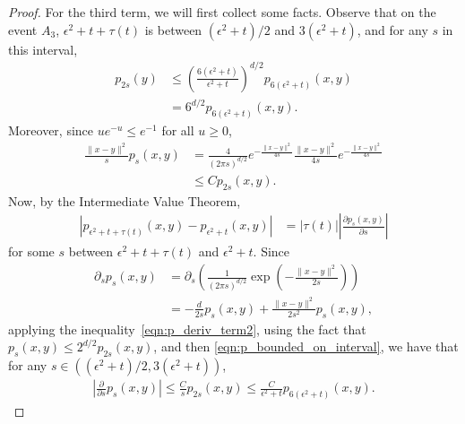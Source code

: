 \documentclass[EJP]{ejpecp} %
\begin{document}
\begin{proof}
    For the third term, we will first collect some facts.
    Observe that on the event $A_3$,
    $\epsilon^2 + t + \tau(t)$ is between
    $(\epsilon^2 + t)/ 2$ and $3(\epsilon^2 + t)$,
    and for any $s$ in this interval,
    \begin{align}
        p_{2s}(y)
        &\le \nonumber
        \left( \frac{
            6 (\epsilon^2 + t)
        }{
            \epsilon^2 + t
        } \right)^{d/2}
        p_{6(\epsilon^2 + t)}(x, y)
        \\ &= \label{eqn:p_bounded_on_interval}
        6^{d/2}
        p_{6(\epsilon^2 + t)}(x, y) .
    \end{align}
    Moreover, since $u e^{-u} \le e^{-1}$ for all $u \ge 0$,
    \begin{align}
        \frac{\|x - y\|^2}{s} p_s(x, y)
        &= \nonumber
        \frac{4}{(2 \pi s)^{d/2}}
        e^{- \frac{ \|x-y\|^2 }{ 4s }}
        \frac{\|x-y\|^2}{4s}
        e^{- \frac{ \|x-y\|^2 }{ 4s }}
        \\ &\le \label{eqn:p_deriv_term2}
        C p_{2s}(x, y) .
    \end{align}
    Now, by the Intermediate Value Theorem,
    \begin{align}
\label{deduction from IVT}
        \left|
            p_{\epsilon^2 + t + \tau(t)}(x, y)
            -
            p_{\epsilon^2 + t}(x, y)
        \right|
        &=
        \left| \tau(t) \right|
        \left| \frac{\partial p_s(x, y)}{\partial s} \right|
    \end{align}
    for some $s$ between $\epsilon^2 + t + \tau(t)$ and $\epsilon^2 + t$.
   Since 
    \begin{align*}
        \partial_ s p_s(x, y)
        &=
        \partial_s
        \left(
            \frac{1}{(2 \pi s)^{d/2}}
            \exp\left( - \frac{\|x - y\|^2}{2 s} \right)
        \right)
        \\ &=
        - \frac{d}{2s} p_s(x, y) + \frac{\|x - y\|^2}{2 s^2} p_s(x, y),
    \end{align*}
    applying the inequality~\eqref{eqn:p_deriv_term2},
    using the fact that $p_s(x, y) \le 2^{d/2} p_{2s}(x,y)$,
    and then \eqref{eqn:p_bounded_on_interval},
    we have that for any $s \in ((\epsilon^2 + t)/ 2, 3(\epsilon^2 + t))$,
    \begin{align*}
        \left| \frac{\partial}{\partial s} p_s(x, y) \right|
        \le
        \frac{C}{s} p_{2s}(x, y) 
        \le
        \frac{C}{\epsilon^2 + t} p_{6(\epsilon^2 + t)}(x, y) .
    \end{align*}

\end{proof}
\end{document}
